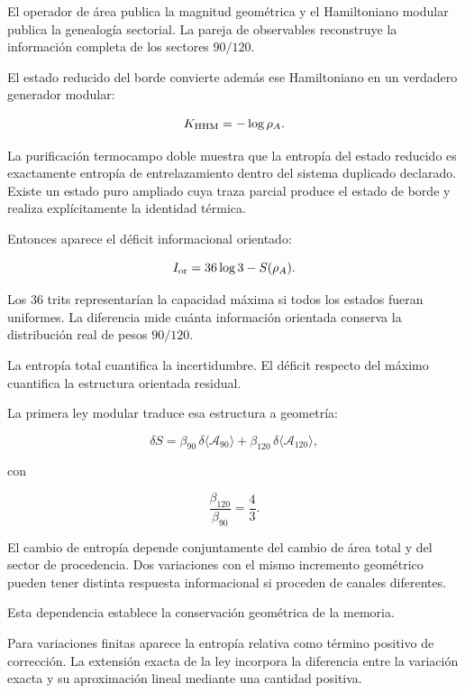 El operador de área publica la magnitud geométrica y el Hamiltoniano modular publica la genealogía sectorial. La pareja de observables reconstruye la información completa de los sectores \(90/120\).\par

El estado reducido del borde convierte además ese Hamiltoniano en un verdadero generador modular:\par

\[
K_{\rm HHM}=-\log\rho_A.
\]

La purificación termocampo doble muestra que la entropía del estado reducido es exactamente entropía de entrelazamiento dentro del sistema duplicado declarado. Existe un estado puro ampliado cuya traza parcial produce el estado de borde y realiza explícitamente la identidad térmica.\par

Entonces aparece el déficit informacional orientado:\par

\[
I_{\rm or}
=
36\log3-S(\rho_A).
\]

Los \(36\) trits representarían la capacidad máxima si todos los estados fueran uniformes. La diferencia mide cuánta información orientada conserva la distribución real de pesos \(90/120\).\par

La entropía total cuantifica la incertidumbre. El déficit respecto del máximo cuantifica la estructura orientada residual.\par

La primera ley modular traduce esa estructura a geometría:\par

\[
\delta S
=
\beta_{90}\,
\delta\langle\mathcal A_{90}\rangle
+
\beta_{120}\,
\delta\langle\mathcal A_{120}\rangle,
\]

con\par

\[
\frac{\beta_{120}}{\beta_{90}}
=
\frac43.
\]

El cambio de entropía depende conjuntamente del cambio de área total y del sector de procedencia. Dos variaciones con el mismo incremento geométrico pueden tener distinta respuesta informacional si proceden de canales diferentes.\par

Esta dependencia establece la conservación geométrica de la memoria.\par

Para variaciones finitas aparece la entropía relativa como término positivo de corrección. La extensión exacta de la ley incorpora la diferencia entre la variación exacta y su aproximación lineal mediante una cantidad positiva.\par

